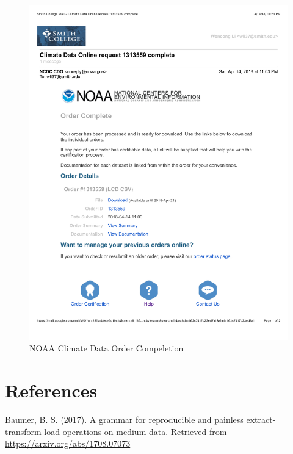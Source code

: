 \documentclass[12pt,twoside]{reedthesis}
\theoremstyle{definition}
\theoremstyle{definition}
\theoremstyle{definition}
\theoremstyle{remark}
\begin{document}
\begin{figure}[h]

{\centering \includegraphics[width=5.8in]{figure/app_noaa_com} 

}

\caption{NOAA Climate Data Order Compeletion}\label{fig:noaacom}
\end{figure}
\backmatter

\chapter*{References}\label{references}


\noindent

\setlength{\parindent}{-0.20in} \setlength{\leftskip}{0.20in}
\setlength{\parskip}{8pt}

\hypertarget{refs}{}
\hypertarget{ref-pkgetl}{}
Baumer, B. S. (2017). A grammar for reproducible and painless
extract-transform-load operations on medium data. Retrieved from
\url{https://arxiv.org/abs/1708.07073}
\end{document}

